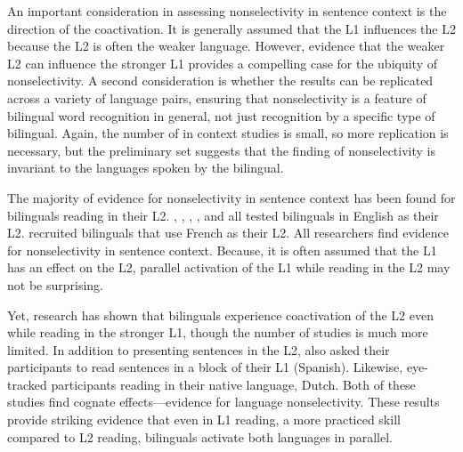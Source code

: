 An important consideration in assessing nonselectivity in sentence context is the direction of the coactivation. It is generally assumed that the L1 influences the L2 because the L2 is often the weaker language. However, evidence that the weaker  L2 can influence the stronger L1 provides a compelling case for the ubiquity of nonselectivity. A second consideration is whether the results can be replicated across a variety of language pairs, ensuring that nonselectivity is a feature of bilingual word recognition in general, not just recognition by a specific type of bilingual. Again, the number of in context studies is small, so more replication is necessary, but the preliminary set  suggests that the finding of nonselectivity is invariant to the languages spoken by the bilingual. 

The majority of evidence for nonselectivity in sentence context has been found for bilinguals reading in their L2. \textcite{Baten2010}, \textcite{Duyck2007}, \textcite{VanAssche2010},  \textcite{Libben2009}, and  \textcite{Schwartz2006} all tested bilinguals in English as their L2. \textcite{Chambers2009} recruited bilinguals that use French as their L2. All researchers find evidence for nonselectivity in sentence context. Because, it is often assumed that the L1 has an effect on the L2, parallel activation of the L1 while reading in the L2 may not be surprising. 

Yet, research has shown that bilinguals experience coactivation of the L2 even while reading in the stronger L1, though the number of studies is much more limited. In addition to presenting sentences in the L2, \textcite{Schwartz2006} also asked their participants to read sentences in a block of their L1 (Spanish). Likewise, \textcite{VanAssche2009} eye-tracked participants reading in their native language, Dutch. Both of these studies find cognate effects---evidence for language nonselectivity. These results provide striking evidence that even in L1 reading, a more practiced skill compared to L2 reading, bilinguals activate both languages in parallel. 

